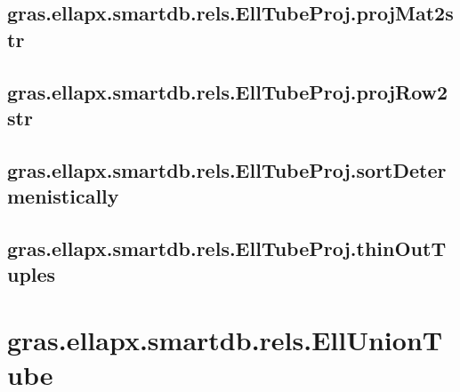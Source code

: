 \documentclass[letterpaper,10pt,english]{sphinxmanual}
\begin{document}
\subsection{gras.ellapx.smartdb.rels.EllTubeProj.projMat2str}
\label{chap_functions:gras-ellapx-smartdb-rels-elltubeproj-projmat2str}

\subsection{gras.ellapx.smartdb.rels.EllTubeProj.projRow2str}
\label{chap_functions:gras-ellapx-smartdb-rels-elltubeproj-projrow2str}

\subsection{gras.ellapx.smartdb.rels.EllTubeProj.sortDetermenistically}
\label{chap_functions:gras-ellapx-smartdb-rels-elltubeproj-sortdetermenistically}

\subsection{gras.ellapx.smartdb.rels.EllTubeProj.thinOutTuples}
\label{chap_functions:gras-ellapx-smartdb-rels-elltubeproj-thinouttuples}

\section{gras.ellapx.smartdb.rels.EllUnionTube}
\label{chap_functions:gras-ellapx-smartdb-rels-elluniontube}
\end{document}
